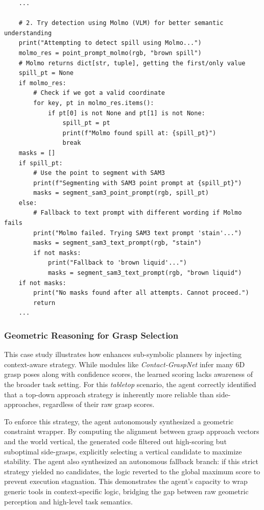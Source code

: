 \begin{lstlisting}
    ...
    
    # 2. Try detection using Molmo (VLM) for better semantic understanding
    print("Attempting to detect spill using Molmo...")
    molmo_res = point_prompt_molmo(rgb, "brown spill")
    # Molmo returns dict[str, tuple], getting the first/only value
    spill_pt = None
    if molmo_res:
        # Check if we got a valid coordinate
        for key, pt in molmo_res.items():
            if pt[0] is not None and pt[1] is not None:
                spill_pt = pt
                print(f"Molmo found spill at: {spill_pt}")
                break
    masks = []
    if spill_pt:
        # Use the point to segment with SAM3
        print(f"Segmenting with SAM3 point prompt at {spill_pt}")
        masks = segment_sam3_point_prompt(rgb, spill_pt)
    else:
        # Fallback to text prompt with different wording if Molmo fails
        print("Molmo failed. Trying SAM3 text prompt 'stain'...")
        masks = segment_sam3_text_prompt(rgb, "stain")
        if not masks:
            print("Fallback to 'brown liquid'...")
            masks = segment_sam3_text_prompt(rgb, "brown liquid")
    if not masks:
        print("No masks found after all attempts. Cannot proceed.")
        return
    ...
\end{lstlisting}

\subsubsection{Geometric Reasoning for Grasp Selection}
\label{app:geometric_reasoning} This case study illustrates how \sysname{} enhances sub-symbolic planners by injecting context-aware strategy. While modules like \textit{Contact-GraspNet} infer many 6D grasp poses along with confidence scores, the learned scoring lacks awareness of the broader task setting. For this \textit{tabletop} scenario, the agent correctly identified that a top-down approach strategy is inherently more reliable than side-approaches, regardless of their raw grasp scores.

To enforce this strategy, the agent autonomously synthesized a geometric constraint wrapper. By computing the alignment between grasp approach vectors and the world vertical, the generated code filtered out high-scoring but suboptimal side-grasps, explicitly selecting a vertical candidate to maximize stability. The agent also synthesized an autonomous fallback branch: if this strict strategy yielded no candidates, the logic reverted to the global maximum score to prevent execution stagnation. This demonstrates the agent's capacity to wrap generic tools in context-specific logic, bridging the gap between raw geometric perception and high-level task semantics.


